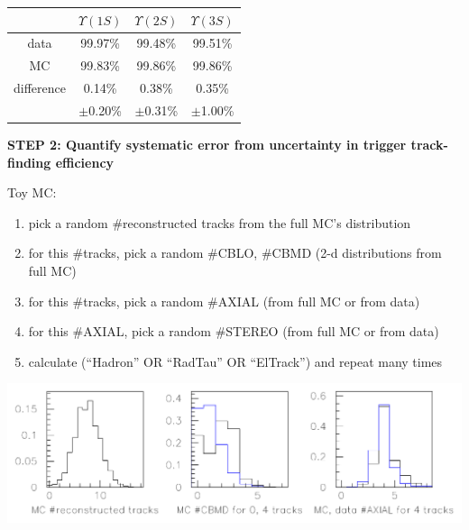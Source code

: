 \documentclass[landscape]{article}
\begin{document}
\begin{center}
  \renewcommand{\arraystretch}{1.25}
  \begin{tabular}{c c c c}
  \mbox{\hspace{4 cm}} & \mbox{\hspace{2 cm}} $\Upsilon(1S)$ \mbox{\hspace{2 cm}} & \mbox{\hspace{2 cm}} $\Upsilon(2S)$ \mbox{\hspace{2 cm}} & \mbox{\hspace{2 cm}} $\Upsilon(3S)$ \mbox{\hspace{2 cm}} \\\hline
  data & 99.97\% & 99.48\% & 99.51\% \\
  MC & 99.83\% & 99.86\% & 99.86\% \\
  difference & 0.14\% & 0.38\% & 0.35\% \\
  & $\pm$0.20\% & $\pm$0.31\% & $\pm$1.00\%
  \end{tabular}
\end{center}

\pagebreak

\vspace{1 cm}

{\bf STEP 2: Quantify systematic error from uncertainty in trigger
track-finding efficiency}

\vspace{1.5 cm}

Toy MC: 
\begin{enumerate}

  \item pick a random \#reconstructed tracks from the full MC's distribution

  \item for this \#tracks, pick a random \#CBLO, \#CBMD (2-d distributions from full MC)

  \item for this \#tracks, pick a random \#AXIAL (from full MC or from data)

  \item for this \#AXIAL, pick a random \#STEREO (from full MC or from data)

  \item calculate (``Hadron'' OR ``RadTau'' OR ``ElTrack'') and repeat many times

\end{enumerate}

\vfill

\begin{center} \includegraphics[width=0.9\linewidth]{drawplots.pdf} \end{center}
\end{document}
